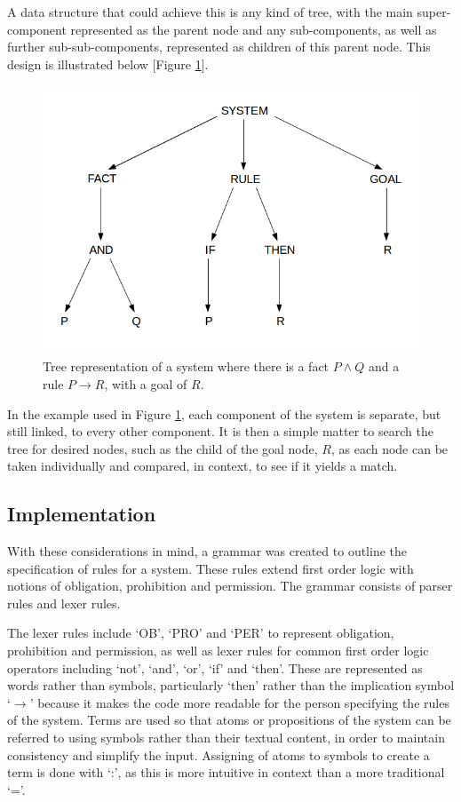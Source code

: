\documentclass{l4proj}
\begin{document}
A data structure that could achieve this is any kind of tree, with the main super-component represented as the parent node and any sub-components, as well as further sub-sub-components, represented as children of this parent node. This design is illustrated below [Figure \ref{figtree}]. 

\begin{figure}[H]
\begin{center}
\includegraphics[width=12cm, height=8cm]{figures/systree.png}
\caption[Tree representation of a system]{\label{figtree}Tree representation of a system where there is a fact \(P \land Q\) and a rule \(P \rightarrow R\), with a goal of $R$.}\end{center}\end{figure}

In the example used in Figure \ref{figtree}, each component of the system is separate, but still linked, to every other component. It is then a simple matter to search the tree for desired nodes, such as the child of the goal node, $R$, as each node can be taken individually and compared, in context, to see if it yields a match. 

\subsection{Implementation}
With these considerations in mind, a grammar was created to outline the specification of rules for a system. These rules extend first order logic with notions of obligation, prohibition and permission. The grammar consists of parser rules and lexer rules. 

The lexer rules include `OB', `PRO' and `PER' to represent obligation, prohibition and permission, as well as lexer rules for common first order logic operators including `not', `and', `or', `if' and `then'. These are represented as words rather than symbols, particularly `then' rather than the implication symbol `$\rightarrow$' because it makes the code more readable for the person specifying the rules of the system. Terms are used so that atoms or propositions of the system can be referred to using symbols rather than their textual content, in order to maintain consistency and simplify the input. Assigning of atoms to symbols to create a term is done with `:', as this is more intuitive in context than a more traditional `='. 
\end{document}
